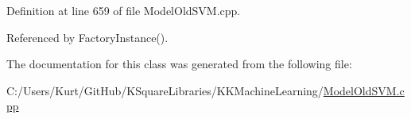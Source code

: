 Definition at line 659 of file Model\+Old\+S\+V\+M.\+cpp.



Referenced by Factory\+Instance().



The documentation for this class was generated from the following file\+:\begin{DoxyCompactItemize}
\item 
C\+:/\+Users/\+Kurt/\+Git\+Hub/\+K\+Square\+Libraries/\+K\+K\+Machine\+Learning/\hyperlink{_model_old_s_v_m_8cpp}{Model\+Old\+S\+V\+M.\+cpp}\end{DoxyCompactItemize}

